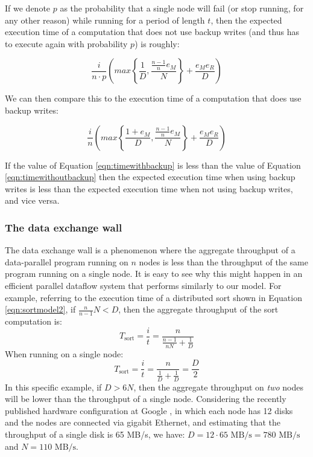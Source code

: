 \documentclass{acm_proc_article-sp}
\begin{document}
If we denote $p$ as the probability that a single node will fail (or stop
running, for any other reason) while running for a period of length $t$, then
the expected execution time of a computation that does not use backup
writes (and thus has to execute again with probability $p$) is roughly:

\begin{equation}
\frac{i}{n \cdot p} \left( max\left\{\frac{1}{D},
\frac{\frac{n-1}{n} e_M}{N}\right\} + \frac{e_M e_R}{D} \right)
\label{eqn:timewithoutbackup}
\end{equation}

We can then compare this to the execution time of a computation that does use
backup writes:

\begin{equation}
\frac{i}{n} \left( max\left\{\frac{1+e_M}{D},
\frac{\frac{n-1}{n} e_M}{N}\right\} + \frac{e_M e_R}{D} \right)
\label{eqn:timewithbackup}
\end{equation}

If the value of Equation \ref{eqn:timewithbackup} is less than the value of
Equation \ref{eqn:timewithoutbackup} then the expected execution time when
using backup writes is less than the expected execution time when not using
backup writes, and vice versa.

\subsubsection{The data exchange wall}

The data exchange wall is a phenomenon where the aggregate throughput of a
data-parallel program running on $n$ nodes is less than the throughput of the
same program running on a single node. It is easy to see why this might happen
in an efficient parallel dataflow system that performs similarly to our model.
For example, referring to the execution time of a distributed sort shown in
Equation \ref{eqn:sortmodel2}, if $\frac{n}{n-1} N < D$, then the aggregate
throughput of the sort computation is: \[T_\text{sort} = \frac{i}{t} =
\frac{n}{\frac{n-1}{n N} + \frac{1}{D}}\] When running on a single node:
\[T_\text{sort} = \frac{i}{t} = \frac{n}{\frac{1}{D} + \frac{1}{D}} =
\frac{D}{2}\] In this specific example, if $D > 6 N$, then the aggregate
throughput on \emph{two} nodes will be lower than the throughput of a single
node. Considering the recently published hardware configuration at Google
\cite{sorting1pb}, in which each node has 12 disks and the nodes are connected
via gigabit Ethernet, and estimating that the throughput of a single disk is 65
MB/s, we have: $D = 12 \cdot 65 \text{ MB/s} = 780 \text{ MB/s}$ and $N = 110
\text{ MB/s}$.
\end{document}
